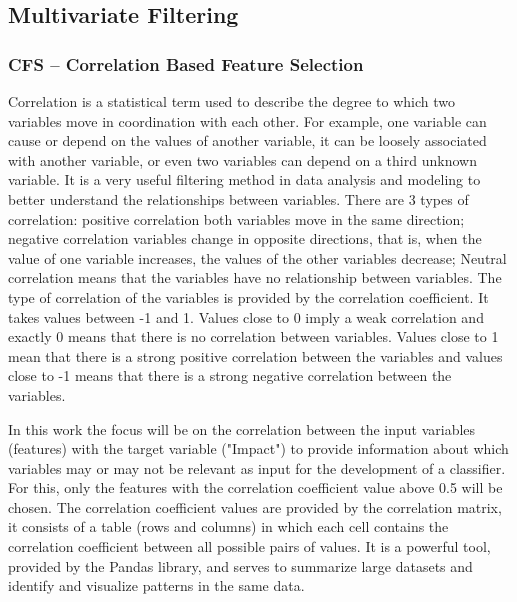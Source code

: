 \subsection{Multivariate Filtering} %
\label{sec:inserting_tables}

\subsubsection{CFS – Correlation Based Feature Selection} 
\label{sec:inserting_tables}
\hspace{10px}Correlation is a statistical term used to describe the degree to which two variables move in coordination with each other. For example, one variable can cause or depend on the values of another variable, it can be loosely associated with another variable, or even two variables can depend on a third unknown variable.  It is a very useful filtering method in data analysis and modeling to better understand the relationships between variables. There are 3 types of correlation: positive correlation both variables move in the same direction; negative correlation variables change in opposite directions, that is, when the value of one variable increases, the values of the other variables decrease; Neutral correlation means that the variables have no relationship between variables. The type of correlation of the variables is provided by the correlation coefficient. It takes values between -1 and 1. Values close to 0 imply a weak correlation and exactly 0 means that there is no correlation between variables. Values close to 1 mean that there is a strong positive correlation between the variables and values close to -1 means that there is a strong negative correlation between the variables.

In this work the focus will be on the correlation between the input variables (features) with the target variable ("Impact") to provide information about which variables may or may not be relevant as input for the development of a classifier. For this, only the features with the correlation coefficient value above 0.5 will be chosen. The correlation coefficient values are provided by the correlation matrix, it consists of a table (rows and columns) in which each cell contains the correlation coefficient between all possible pairs of values. It is a powerful tool, provided by the Pandas library, and serves to summarize large datasets and identify and visualize patterns in the same data.


